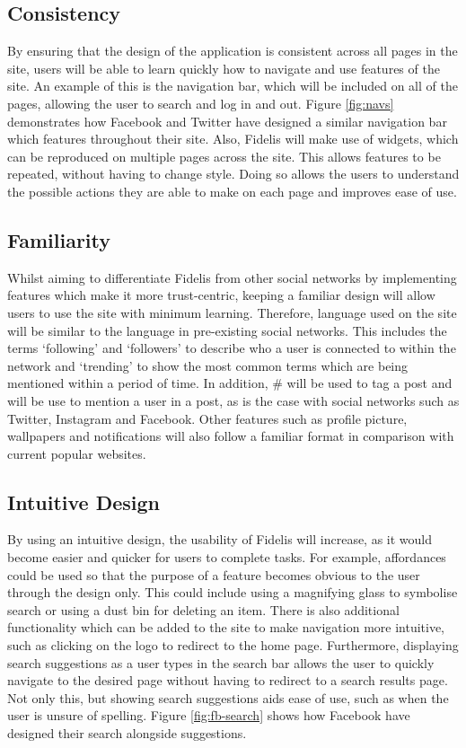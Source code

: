 \subsection{Consistency}
By ensuring that the design of the application is consistent across all pages in the site, users will be able to learn quickly how to navigate and use features of the site. An example of this is the navigation bar, which will be included on all of the pages, allowing the user to search and log in and out. Figure \ref{fig:navs} demonstrates how Facebook and Twitter have designed a similar navigation bar which features throughout their site. Also, Fidelis will make use of widgets, which can be reproduced on multiple pages across the site. This allows features to be repeated, without having to change style. Doing so allows the users to understand the possible actions they are able to make on each page and improves ease of use.

\subsection{Familiarity}
Whilst aiming to differentiate Fidelis from other social networks by implementing features which make it more trust-centric, keeping a familiar design will allow users to use the site with minimum learning. Therefore, language used on the site will be similar to the language in pre-existing social networks. This includes the terms `following' and `followers' to describe who a user is connected to within the network and `trending' to show the most common terms which are being mentioned within a period of time. In addition, # will be used to tag a post and \@ will be use to mention a user in a post, as is the case with social networks such as Twitter, Instagram and Facebook. Other features such as profile picture, wallpapers and notifications will also follow a familiar format in comparison with current popular websites.

\subsection{Intuitive Design}
By using an intuitive design, the usability of Fidelis will increase, as it would become easier and quicker for users to complete tasks. For example, affordances could be used so that the purpose of a feature becomes obvious to the user through the design only. This could include using a magnifying glass to symbolise search or using a dust bin for deleting an item. There is also additional functionality which can be added to the site to make navigation more intuitive, such as clicking on the logo to redirect to the home page. Furthermore, displaying search suggestions as a user types in the search bar allows the user to quickly navigate to the desired page without having to redirect to a search results page. Not only this, but showing search suggestions aids ease of use, such as when the user is unsure of spelling. Figure \ref{fig:fb-search} shows how Facebook have designed their search alongside suggestions.

